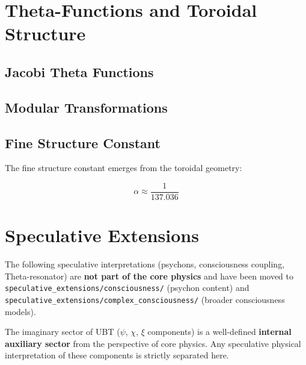 \documentclass[12pt,a4paper]{article}
\begin{document}
\section{Theta-Functions and Toroidal Structure}
\label{sec:theta_functions}


\subsection{Jacobi Theta Functions}


\subsection{Modular Transformations}


\subsection{Fine Structure Constant}

The fine structure constant emerges from the toroidal geometry:

\begin{equation}
\alpha \approx \frac{1}{137.036}
\end{equation}



\section{Speculative Extensions}
\label{sec:speculative_extensions}

\begin{tcolorbox}[colback=red!5!white,colframe=red!75!black,title=Note: Speculative Content Quarantined]
The following speculative interpretations (psychons, consciousness coupling, Theta-resonator)
are \textbf{not part of the core physics} and have been moved to
\texttt{speculative\_extensions/consciousness/} (psychon content) and
\texttt{speculative\_extensions/complex\_consciousness/} (broader consciousness models).

The imaginary sector of UBT ($\psi$, $\chi$, $\xi$ components) is a well-defined
\textbf{internal auxiliary sector} from the perspective of core physics.
Any speculative physical interpretation of these components is strictly separated here.
\end{tcolorbox}
\end{document}
